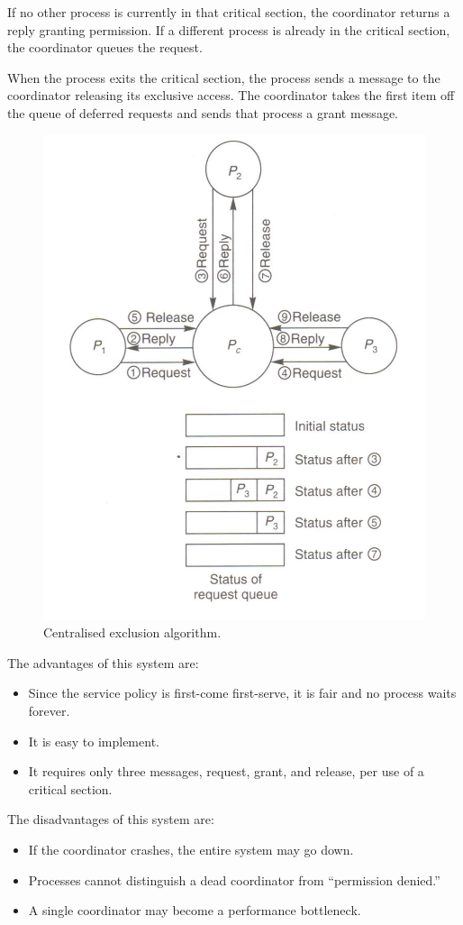 If no other process is currently in that critical section, the coordinator returns a reply granting permission. If a different process is already in the critical section, the coordinator 
queues the request. 

When the process exits the critical section, the process sends a message to the coordinator releasing its exclusive access. The coordinator takes the first item off the queue of deferred requests and sends that process a grant message.

\begin{figure}
\centering
\includegraphics[width=0.7\linewidth]{screenshot033}
\caption{Centralised exclusion algorithm.}
\label{fig:screenshot033}
\end{figure}

The advantages of this system are: \begin{itemize}
\item Since the service policy is first-come first-serve, it is fair and no process waits forever.
\item It is easy to implement.
\item It requires only three messages, request, grant, and release, per use of a critical section.
\end{itemize}

The disadvantages of this system are: \begin{itemize}
\item If the coordinator crashes, the entire system may go down.
\item Processes cannot distinguish a dead coordinator from “permission denied.”
\item A single coordinator may become a performance bottleneck. 
\end{itemize}


